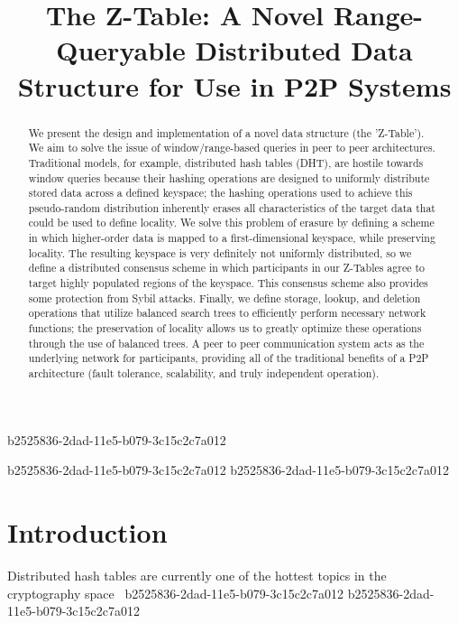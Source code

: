 \documentclass[12pt]{article}
\title{The Z-Table: A Novel Range-Queryable Distributed Data Structure for Use in P2P Systems}
\begin{document}
\maketitle

b2525836-2dad-11e5-b079-3c15c2c7a012\begin{abstract}
We present the design and implementation of a novel data structure (the 'Z-Table'). We aim to solve the issue of window/range-based queries in peer to peer architectures. Traditional models, for example,  distributed hash tables (DHT), are hostile towards window queries because their hashing operations are designed to uniformly distribute stored data across a defined keyspace; the hashing operations used to achieve this pseudo-random distribution inherently erases all characteristics of the target data that could be used to define locality. We solve this problem of erasure by defining a scheme in which higher-order data is mapped to a first-dimensional keyspace, while preserving locality. The resulting keyspace is very definitely not uniformly distributed, so we define a distributed consensus scheme in which participants in our Z-Tables agree to target highly populated regions of the keyspace. This consensus scheme also provides some protection from Sybil attacks. Finally, we define storage, lookup, and deletion operations that utilize balanced search trees to efficiently perform necessary network functions; the preservation of locality allows us to greatly optimize these operations through the use of balanced trees. A peer to peer communication system acts as the underlying network for participants, providing all of the traditional benefits of a P2P architecture (fault tolerance, scalability, and truly independent operation).
\end{abstract}
b2525836-2dad-11e5-b079-3c15c2c7a012
b2525836-2dad-11e5-b079-3c15c2c7a012
\newpage
\section{Introduction}
Distributed hash tables are currently one of the hottest topics in the cryptography space~\cite{Stoica:2001dj,Rowstron:2001ea,Ratnasamy:2001wn}
b2525836-2dad-11e5-b079-3c15c2c7a012
\printbibliography
b2525836-2dad-11e5-b079-3c15c2c7a012
\end{document}
